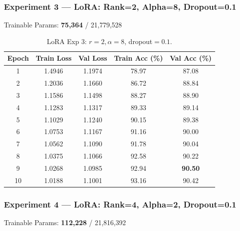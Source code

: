 \documentclass[11pt,a4paper]{article}
\begin{document}
\subsubsection*{Experiment 3 — LoRA: Rank=2, Alpha=8, Dropout=0.1}
\begin{center}
\small Trainable Params: \textbf{75,364} / 21,779,528
\end{center}

\begin{table}[H]
\centering
\begin{tabular}{@{}ccccc@{}}
\toprule
\textbf{Epoch} & \textbf{Train Loss} & \textbf{Val Loss} & \textbf{Train Acc (\%)} & \textbf{Val Acc (\%)} \\
\midrule
1  & 1.4946 & 1.1974 & 78.97 & 87.08 \\
2  & 1.2036 & 1.1660 & 86.72 & 88.84 \\
3  & 1.1586 & 1.1498 & 88.27 & 88.90 \\
4  & 1.1283 & 1.1317 & 89.33 & 89.14 \\
5  & 1.1029 & 1.1240 & 90.15 & 89.38 \\
6  & 1.0753 & 1.1167 & 91.16 & 90.00 \\
7  & 1.0562 & 1.1090 & 91.78 & 90.04 \\
8  & 1.0375 & 1.1066 & 92.58 & 90.22 \\
9  & 1.0268 & 1.0985 & 92.94 & \textbf{90.50} \\
10 & 1.0188 & 1.1001 & 93.16 & 90.42 \\
\bottomrule
\end{tabular}
\caption{LoRA Exp 3: $r=2, \alpha=8$, dropout$=0.1$.}
\end{table}

\subsubsection*{Experiment 4 — LoRA: Rank=4, Alpha=2, Dropout=0.1}
\begin{center}
\small Trainable Params: \textbf{112,228} / 21,816,392
\end{center}
\end{document}
